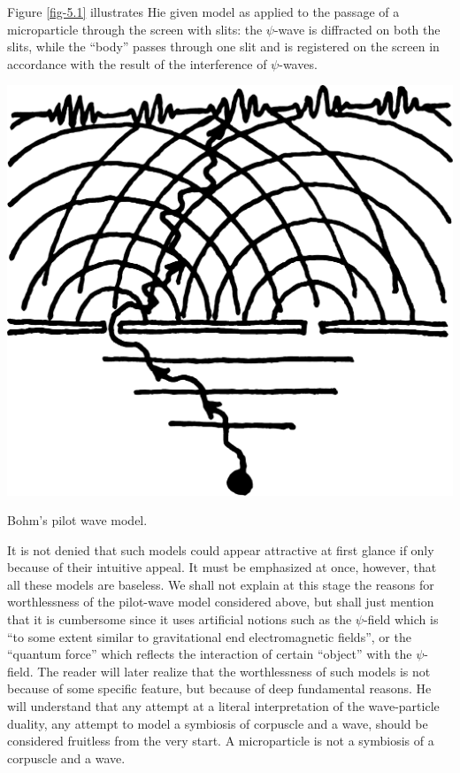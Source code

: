 \documentclass[a4paper,sfsidenotes,colorlinks=true]{tufte-book}
\numberwithin{equation}{section}
\numberwithin{figure}{section}
\begin{document}
\begin{fullwidth}
  \textsf{\small Figure \ref{fig-5.1} illustrates Hie given model as
    applied to the passage of a microparticle through the screen with
    slits: the $\psi$-wave is diffracted on both the slits, while the
    ``body'' passes through one slit and is registered on the screen
    in accordance with the result of the interference of $\psi$-waves.
  }
\begin{marginfigure}[6.5cm]%
\centering
\includegraphics[width=\linewidth]{figures/fig-05-01.pdf}
\caption{Bohm's pilot wave model.}
\label{fig-5.1}
\end{marginfigure}



\end{fullwidth}
\vspace{5pt}
\setlength{\leftskip}{0pt}

It is not denied that such models could appear attractive at first
glance if only because of their intuitive appeal. It must be
emphasized at once, however, that all these models are baseless. We
shall not explain at this stage the reasons for worthlessness of the
pilot-wave model considered above, but shall just mention that it is
cumbersome since it uses artificial notions such as the $\psi$-field which
is ``to some extent similar to gravitational end electromagnetic
fields'', or the ``quantum force'' which reflects the interaction of
certain ``object'' with the $\psi$-field. The reader will later realize that
the worthlessness of such models is not because of some specific
feature, but because of deep fundamental reasons. He will understand
that any attempt at a literal interpretation of the wave-particle
duality, any attempt to model a symbiosis of corpuscle and a wave,
should be considered fruitless from the very start. A microparticle
is not a symbiosis of a corpuscle and a wave.
\end{document}

